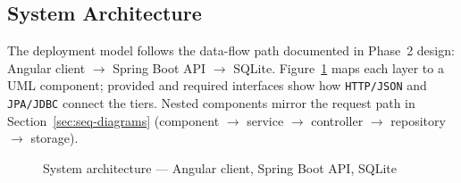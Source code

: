 \subsection{System Architecture}\label{sec:architecture}
The deployment model follows the data-flow path documented in Phase~2 design: Angular client $\rightarrow$
Spring Boot API $\rightarrow$ SQLite. Figure~\ref{fig:component-architecture} maps each layer to a UML
component; provided and required interfaces show how \texttt{HTTP/JSON} and \texttt{JPA/JDBC} connect
the tiers. Nested components mirror the request path in Section~\ref{sec:seq-diagrams} (component
$\rightarrow$ service $\rightarrow$ controller $\rightarrow$ repository $\rightarrow$ storage). 

\begin{figure}[htbp]
  \centering
  \caption{System architecture --- Angular client, Spring Boot API, SQLite}
  \label{fig:component-architecture}
\end{figure}

\newpage
